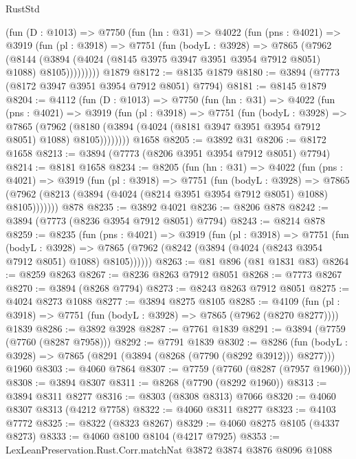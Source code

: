 \begin{lexlean}{RustStd}
\begin{coremodule}
      (fun (D : @1013) =>
      @7750
        (fun (hn : @31) =>
        @4022
          (fun (pns : @4021) =>
          @3919
            (fun (pl : @3918) =>
            @7751
              (fun (bodyL : @3928) =>
              @7865
                (@7962
                  (@8144
                    (@3894 (@4024 (@8145 @3975 @3947 @3951 @3954 @7912 @8051) @1088) @8105)))))))))
    @1879
@8172 := @8135 @1879
@8180 := @3894 (@7773 (@8172 @3947 @3951 @3954 @7912 @8051) @7794)
@8181 := @8145 @1879
@8204 := @4112
    (fun (D : @1013) =>
    @7750
      (fun (hn : @31) =>
      @4022
        (fun (pns : @4021) =>
        @3919
          (fun (pl : @3918) =>
          @7751
            (fun (bodyL : @3928) =>
            @7865
              (@7962 (@8180 (@3894 (@4024 (@8181 @3947 @3951 @3954 @7912 @8051) @1088) @8105))))))))
    @1658
@8205 := @3892 @31
@8206 := @8172 @1658
@8213 := @3894 (@7773 (@8206 @3951 @3954 @7912 @8051) @7794)
@8214 := @8181 @1658
@8234 := @8205
    (fun (hn : @31) =>
    @4022
      (fun (pns : @4021) =>
      @3919
        (fun (pl : @3918) =>
        @7751
          (fun (bodyL : @3928) =>
          @7865 (@7962 (@8213 (@3894 (@4024 (@8214 @3951 @3954 @7912 @8051) @1088) @8105)))))))
    @878
@8235 := @3892 @4021
@8236 := @8206 @878
@8242 := @3894 (@7773 (@8236 @3954 @7912 @8051) @7794)
@8243 := @8214 @878
@8259 := @8235
    (fun (pns : @4021) =>
    @3919
      (fun (pl : @3918) =>
      @7751
        (fun (bodyL : @3928) =>
        @7865 (@7962 (@8242 (@3894 (@4024 (@8243 @3954 @7912 @8051) @1088) @8105))))))
@8263 := @81 @896 (@81 @1831 @83)
@8264 := @8259 @8263
@8267 := @8236 @8263 @7912 @8051
@8268 := @7773 @8267
@8270 := @3894 (@8268 @7794)
@8273 := @8243 @8263 @7912 @8051
@8275 := @4024 @8273 @1088
@8277 := @3894 @8275 @8105
@8285 := @4109
    (fun (pl : @3918) => @7751 (fun (bodyL : @3928) => @7865 (@7962 (@8270 @8277))))
    @1839
@8286 := @3892 @3928
@8287 := @7761 @1839
@8291 := @3894 (@7759 (@7760 (@8287 @7958)))
@8292 := @7791 @1839
@8302 := @8286
    (fun (bodyL : @3928) => @7865 (@8291 (@3894 (@8268 (@7790 (@8292 @3912))) @8277)))
    @1960
@8303 := @4060 @7864
@8307 := @7759 (@7760 (@8287 (@7957 @1960)))
@8308 := @3894 @8307
@8311 := @8268 (@7790 (@8292 @1960))
@8313 := @3894 @8311 @8277
@8316 := @8303 (@8308 @8313) @7066
@8320 := @4060 @8307 @8313 (@4212 @7758)
@8322 := @4060 @8311 @8277
@8323 := @4103 @7772
@8325 := @8322 (@8323 @8267)
@8329 := @4060 @8275 @8105 (@4337 @8273)
@8333 := @4060 @8100 @8104 (@4217 @7925)
@8353 := LexLeanPreservation.Rust.Corr.matchNat
    @3872
    @3874
    @3876
    @8096
    @1088

\end{coremodule}
\end{lexlean}
